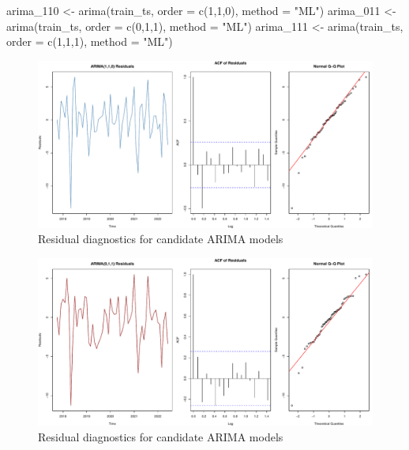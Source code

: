 \documentclass[
  11pt,
]{article}
\newenvironment{Shaded}{\begin{snugshade}}{\end{snugshade}}
\newcommand{\AttributeTok}[1]{\textcolor[rgb]{0.40,0.45,0.13}{#1}}
\newcommand{\DecValTok}[1]{\textcolor[rgb]{0.68,0.00,0.00}{#1}}
\newcommand{\FunctionTok}[1]{\textcolor[rgb]{0.28,0.35,0.67}{#1}}
\newcommand{\NormalTok}[1]{\textcolor[rgb]{0.00,0.23,0.31}{#1}}
\newcommand{\OtherTok}[1]{\textcolor[rgb]{0.00,0.23,0.31}{#1}}
\newcommand{\StringTok}[1]{\textcolor[rgb]{0.13,0.47,0.30}{#1}}
\begin{document}
\begin{Shaded}
\begin{Highlighting}[]
\NormalTok{arima\_110 }\OtherTok{\textless{}{-}} \FunctionTok{arima}\NormalTok{(train\_ts, }\AttributeTok{order =} \FunctionTok{c}\NormalTok{(}\DecValTok{1}\NormalTok{,}\DecValTok{1}\NormalTok{,}\DecValTok{0}\NormalTok{), }\AttributeTok{method =} \StringTok{"ML"}\NormalTok{)}
\NormalTok{arima\_011 }\OtherTok{\textless{}{-}} \FunctionTok{arima}\NormalTok{(train\_ts, }\AttributeTok{order =} \FunctionTok{c}\NormalTok{(}\DecValTok{0}\NormalTok{,}\DecValTok{1}\NormalTok{,}\DecValTok{1}\NormalTok{), }\AttributeTok{method =} \StringTok{"ML"}\NormalTok{)}
\NormalTok{arima\_111 }\OtherTok{\textless{}{-}} \FunctionTok{arima}\NormalTok{(train\_ts, }\AttributeTok{order =} \FunctionTok{c}\NormalTok{(}\DecValTok{1}\NormalTok{,}\DecValTok{1}\NormalTok{,}\DecValTok{1}\NormalTok{), }\AttributeTok{method =} \StringTok{"ML"}\NormalTok{)}
\end{Highlighting}
\end{Shaded}

\begin{figure}[H]

{\centering \includegraphics{project_files/figure-pdf/fig-arima-diagnostics-1.pdf}

}

\caption{Residual diagnostics for candidate ARIMA models}

\end{figure}%

\begin{figure}[H]

{\centering \includegraphics{project_files/figure-pdf/fig-arima-diagnostics-2.pdf}

}

\caption{Residual diagnostics for candidate ARIMA models}

\end{figure}%
\end{document}
